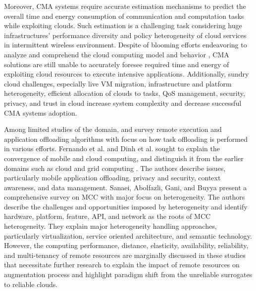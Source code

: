\documentclass[publish]{IEEEtran}
\begin{document}
Moreover, CMA systems require accurate estimation mechanisms to predict the overall time and energy consumption of communication and computation tasks while exploiting clouds. Such estimation is a challenging task considering huge infrastructures' performance diversity \cite{Ou2012} and policy heterogeneity \cite{Z2012} of cloud services in intermittent wireless environment. Despite of blooming efforts endeavoring to analyze and comprehend the cloud computing model and behavior \cite{Salah2012, Smith2012, DiFrancesco2012,Heide2012}, CMA solutions are still unable to accurately foresee required time and energy of exploiting cloud resources to execute intensive applications. Additionally, sundry cloud challenges, especially live VM migration, infrastructure and platform heterogeneity, efficient allocation of clouds to tasks, QoS management, security, privacy, and trust in cloud increase system complexity and decrease successful CMA systems adoption. 

Among limited studies of the domain, \cite{Sharifi2011} and \cite{Shiraz2012b} survey remote execution and application offloading algorithms with focus on how task offloading is performed in various efforts. Fernando et al. \cite{fernando2012mobile} and Dinh et al. \cite{Dinh2011} sought to explain the convergence of mobile and cloud computing, and distinguish it from the earlier domains such as cloud and grid computing \cite{Foster2001}. The authors describe issues, particularly mobile application offloading, privacy and security, context awareness, and data management. Sanaei, Abolfazli, Gani, and Buyya \cite{Z2012} present a comprehensive survey on MCC with major focus on heterogeneity. The authors describe the challenges and opportunities imposed by heterogeneity and identify hardware, platform, feature, API, and network as the roots of MCC heterogeneity. They explain major heterogeneity handling approaches, particularly virtualization, service oriented architecture, and semantic technology. However, the computing performance, distance, elasticity, availability, reliability, and multi-tenancy of remote resources are marginally discussed in these studies that necessitate further research to explain the impact of remote resources on augmentation process and highlight paradigm shift from the unreliable surrogates to reliable clouds. 
\end{document}
